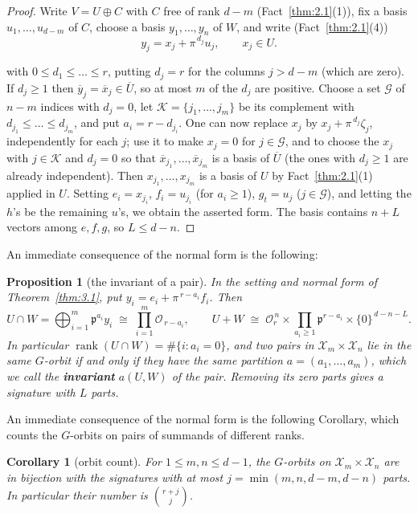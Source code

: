 \documentclass[11pt]{article}
\numberwithin{equation}{section}
\theoremstyle{plain}
\newtheorem{corollary}[theorem]{Corollary}
\newtheorem{proposition}[theorem]{Proposition}
\theoremstyle{definition}
\begin{document}
\begin{proof}
Write $V=U\oplus C$ with $C$ free of rank $d-m$ (Fact~\ref{thm:2.1}(1)), fix a basis
$u_1,\dots,u_{d-m}$ of $C$, choose a basis $y_1,\dots,y_n$ of $W$, and write (Fact~\ref{thm:2.1}(4))
\[
y_j=x_j+\pi^{\,d_j}u_j,\qquad x_j\in U .
\]

with $0\le d_1\le\dots\le r$, putting
$d_j=r$ for the columns $j>d-m$ (which are zero). If $d_j\ge1$ then $\overline
y_j=\overline x_j\in\overline U$, so at most $m$ of the $d_j$ are positive. Choose a set
$\mathcal G$ of $n-m$ indices with $d_j=0$, let $\mathcal K=\{j_1,\dots,j_m\}$ be its
complement with $d_{j_1}\le\dots\le d_{j_m}$, and put $a_i=r-d_{j_i}$. One can now
replace $x_j$ by $x_j+\pi^{\,d_j}\zeta_j$, independently for each $j$; use it to make
$x_j=0$ for $j\in\mathcal G$, and to choose the $x_j$ with $j\in\mathcal K$ and $d_j=0$
so that $\overline x_{j_1},\dots,\overline x_{j_m}$ is a basis of $\overline U$ (the
ones with $d_j\ge1$ are already independent). Then $x_{j_1},\dots,x_{j_m}$ is a basis
of $U$ by Fact~\ref{thm:2.1}(1) applied in $U$. Setting $e_i=x_{j_i}$, $f_i=u_{j_i}$ (for
$a_i\ge1$), $g_t=u_j$ ($j\in\mathcal G$), and letting the $h$'s be the remaining $u$'s,
we obtain the asserted form. The basis contains $n+L$ vectors among $e,f,g$, so
$L\le d-n$.
\end{proof}

An immediate consequence of the normal form is the following:

\begin{proposition}[the invariant of a pair]\label{thm:3.2}
In the setting and normal form of Theorem~\ref{thm:3.1}, put
$y_i=e_i+\pi^{\,r-a_i}f_i$. Then
\[
U\cap W=\bigoplus_{i=1}^{m}\mathfrak{p}^{a_i}y_i\;\cong\;\prod_{i=1}^{m}\mathcal{O}_{\,r-a_i},
\qquad
U+W\;\cong\;\mathcal{O}_r^{\,n}\times\prod_{a_i\ge1}\mathfrak{p}^{r-a_i}\times\{0\}^{\,d-n-L}.
\]
In particular $\operatorname{rank}(U\cap W)=\#\{i:a_i=0\}$, and two pairs in
$\mathcal{X}_m\times \mathcal{X}_n$ lie in the same $G$-orbit if and only if they have the same
partition $a=(a_1,\dots,a_m)$, which we call the \textbf{invariant} $a(U,W)$ of the pair.
Removing its zero parts gives a signature with $L$ parts.
\end{proposition}

An immediate consequence of the normal form is the following Corollary, which counts the $G$-orbits on pairs of summands of different ranks.

\begin{corollary}[orbit count]\label{thm:3.3}
For $1\le m,n\le d-1$, the $G$-orbits on
$\mathcal{X}_m\times \mathcal{X}_n$ are in bijection with the signatures with at most
$j=\min(m,n,d-m,d-n)$ parts. In particular their number is $\binom{r+j}{j}$.
\end{corollary}
\end{document}
